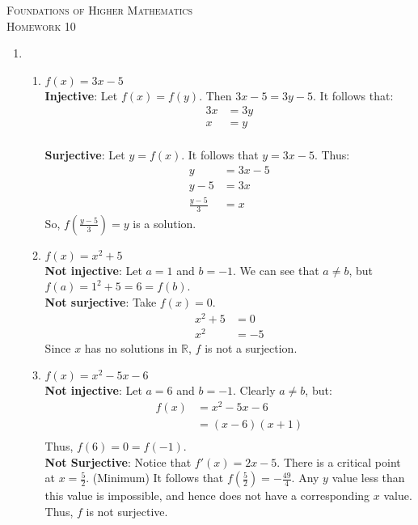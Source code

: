 \documentclass{article}
\theoremstyle{problem}
\theoremstyle{plain}
\theoremstyle{remark}
\begin{document}
\begin{center}
\textsc{\Large Foundations of Higher Mathematics}\\[.3cm]
\textsc{\Large Homework 10}
\end{center}

\begin{enumerate}
  \item 
    \begin{enumerate} 
    \item $f(x) = 3x - 5$\\
      \textbf{Injective}: Let $f(x) = f(y)$. Then $3x - 5 = 3y - 5$. It follows that:
      \begin{align*}
        3x &= 3y\\
        x &= y
      \end{align*}\\
      \textbf{Surjective}: Let $y = f(x)$. It follows that $y = 3x - 5$. Thus:
      \begin{align*}
        y &= 3x - 5\\
        y - 5 &= 3x\\
        \frac{y - 5}{3} &= x
      \end{align*}
      So, $f(\frac{y-5}{3}) = y$ is a solution.
    \item $f(x) = x^2 + 5$\\
      \textbf{Not injective}: Let $a = 1$ and $b = -1$. We can see that $a \not = b$, but $f(a) = 1^2 + 5 = 6 = f(b)$.\\
      \textbf{Not surjective}: Take $f(x) = 0$. 
      \begin{align*}
        x^2 + 5 &= 0\\
        x^2 &= - 5
      \end{align*}
      Since $x$ has no solutions in $\mathbb{R}$, $f$ is not a surjection.
    \item $f(x) = x^2 - 5x - 6$\\
      \textbf{Not injective}: Let $a = 6$ and $b = -1$. Clearly $a \not = b$, but:
      \begin{align*}
        f(x) &= x^2 - 5x - 6\\
        &= (x - 6)(x + 1)\\
      \end{align*}
      Thus, $f(6) = 0 = f(-1)$.\\

      \textbf{Not Surjective}: Notice that $f'(x) = 2x - 5$. There is a critical point at $x = \frac{5}{2}$. (Minimum) It follows that $f(\frac{5}{2}) = -\frac{49}{4}$. Any $y$ value less than this value is impossible, and hence does not have a corresponding $x$ value. Thus, $f$ is not surjective.


\end{enumerate}
\end{enumerate}
\end{document}
